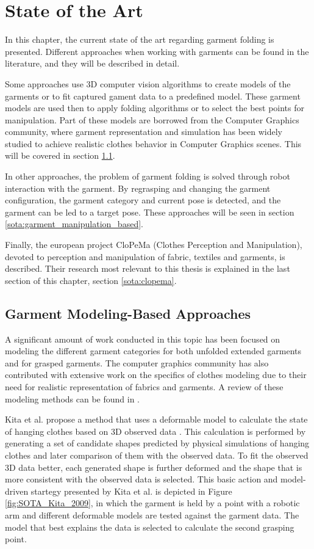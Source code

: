 \chapter{State of the Art}
\label{state_of_the_art}

In this chapter, the current state of the art regarding garment folding is presented. Different approaches when working with garments can be found in the literature, and they will be described in detail.

Some approaches use 3D computer vision algorithms to create models of the garments or to fit captured gament data to a predefined model. These garment models are used then to apply folding algorithms or to select the best points for manipulation. Part of these models are borrowed from the Computer Graphics community, where garment representation and simulation has been widely studied to achieve realistic clothes behavior in Computer Graphics scenes. This will be covered in section \ref{sota:garment_model_based}.

In other approaches, the problem of garment folding is solved through robot interaction with the garment. By regrasping and changing the garment configuration, the garment category and current pose is detected, and the garment can be led to a target pose. These approaches will be seen in section \ref{sota:garment_manipulation_based}.

Finally, the european project CloPeMa (Clothes Perception and Manipulation), devoted to perception and manipulation of fabric, textiles and garments, is described. Their research most relevant to this thesis is explained in the last section of this chapter, section \ref{sota:clopema}.

\section{Garment Modeling-Based Approaches}
\label{sota:garment_model_based}

A significant amount of work conducted in this topic has been focused on modeling the different garment categories for both unfolded extended garments and for grasped garments. The computer graphics community has also contributed with extensive work on the specifics of clothes modeling due to their need for realistic representation of fabrics and garments. A review of these modeling methods can be found in \cite{Chen2009}. 

Kita et al. propose a method that uses a deformable model to calculate the state of hanging clothes based on 3D observed data \cite{Kita2004, Kita2009}. This calculation is performed by generating a set of candidate shapes predicted by physical simulations of hanging clothes and later comparison of them with the observed data. To fit the observed 3D data better, each generated shape is further deformed and the shape that is more consistent with the observed data is selected. This basic action and model-driven startegy presented by Kita et al. is depicted in Figure \ref{fig:SOTA_Kita_2009}, in which the garment is held by a point with a robotic arm and different deformable models are tested against the garment data. The model that best explains the data is selected to calculate the second grasping point. 

